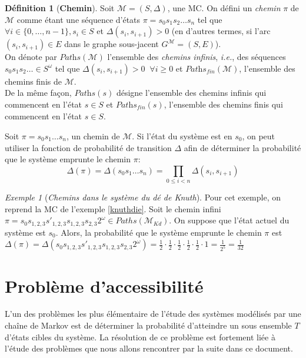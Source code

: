 \documentclass[12pt,a4paper]{report}
\theoremstyle{definition}
\newtheorem{definition}{Définition}[chapter]
\theoremstyle{remark}
\newtheorem{example}{Exemple}[chapter]
\newcommand{\ie}{\textit{i.e.}, }
\begin{document}
\begin{definition}[\textbf{Chemin}]
	Soit $\mathcal{M} = (S, \Delta)$, une MC. On défini un \textit{chemin} $\pi$ de $\mathcal{M}$ comme étant une séquence d'états $\pi = s_0 s_1 s_2 \dots s_n$ tel que $\forall i \in \{0, \dots, n-1\}, s_i \in S$ et $\Delta(s_i, s_{i+1}) > 0$ (en d'autres termes, si l'arc $(s_i, s_{i+1}) \in E$ dans le graphe sous-jacent $G^\mathcal{M} = (S, E)$).%
	\\
	On dénote par $\textit{Paths}(\mathcal{M})$ l'ensemble des \textit{chemins infinis}, \ie des séquences $s_0 s_1 s_2 \dots \in S^\omega$ tel que $\Delta(s_i, s_{i+1}) > 0 \;\;\forall i \geq 0$ et $\textit{Paths}_\textit{fin}(\mathcal{M})$, l'ensemble des chemins finis de $\mathcal{M}$.\\
	De la même façon, $\textit{Paths}(s)$ désigne l'ensemble des chemins infinis qui commencent en l'état $s \in S$ et $\textit{Paths}_\textit{fin}(s)$, l'ensemble des chemins finis qui commencent en l'état $s \in S$.
\end{definition}

Soit $\pi = s_0 s_1 \dots s_n$, un chemin de $\mathcal{M}$. Si l'état du système est en $s_0$, on peut utiliser la fonction de probabilité de transition $\Delta$ afin de déterminer la probabilité que le système emprunte le chemin $\pi$: 
\[ \Delta(\pi) = \Delta(s_0 s_1 \dots s_n) = \prod_{0 \leq i < n} \Delta(s_i, s_{i+1}) \]

\begin{example}[\textit{Chemins dans le système du dé de Knuth}]
	Pour cet exemple, on reprend la MC de l'exemple \ref{knuthdie}. Soit le chemin infini $\pi = s_0 s_{1,2,3} s'_{1, 2, 3} s_{1,2,3} s_{2,3} 2^\omega \in Paths(\mathcal{M}_{Kd})$.
	On suppose que l'état actuel du système est $s_0$. Alors, la probabilité que le système emprunte le chemin $\pi$ est $\Delta(\pi) = \Delta(s_0 s_{1,2,3} s'_{1, 2, 3} s_{1,2,3} s_{2,3} 2^\omega) = \frac{1}{2} \cdot \frac{1}{2} \cdot \frac{1}{2} \cdot \frac{1}{2} \cdot \frac{1}{2} \cdot 1 = \frac{1}{2^5} = \frac{1}{32}$
\end{example}

\section{Problème d'accessibilité}

L'un des problèmes les plus élémentaire de l'étude des systèmes modélisés par une chaîne de Markov est de déterminer la probabilité d'atteindre un sous ensemble $T$ d'états cibles du système. La résolution de ce problème est fortement liée à l'étude des problèmes que nous allons rencontrer par la suite dans ce document.
\end{document}
